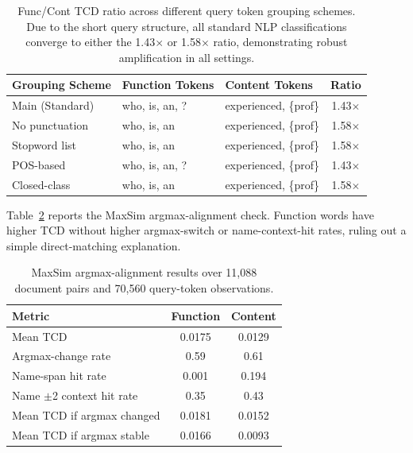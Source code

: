 \documentclass[11pt]{article}
\begin{document}
\begin{table}[!ht]
\centering
\scriptsize
\setlength{\tabcolsep}{2pt}
\begin{tabular}{lp{}p{}c}
\toprule
\textbf{Grouping Scheme} & \textbf{Function Tokens} & \textbf{Content Tokens} & \textbf{Ratio} \\
\midrule
Main (Standard) & who, is, an, ? & experienced, \{prof\} & 1.43$\times$ \\
No punctuation  & who, is, an     & experienced, \{prof\} & 1.58$\times$ \\
Stopword list   & who, is, an     & experienced, \{prof\} & 1.58$\times$ \\
POS-based       & who, is, an, ? & experienced, \{prof\} & 1.43$\times$ \\
Closed-class    & who, is, an     & experienced, \{prof\} & 1.58$\times$ \\
\bottomrule
\end{tabular}
\caption{Func/Cont TCD ratio across different query token grouping schemes. Due to the short query structure, all standard NLP classifications converge to either the 1.43$\times$ or 1.58$\times$ ratio, demonstrating robust amplification in all settings.}
\label{tab:grouping}
\end{table}

Table~\ref{tab:argmax_alignment} reports the MaxSim argmax-alignment check. Function words have higher TCD without higher argmax-switch or name-context-hit rates, ruling out a simple direct-matching explanation.

\begin{table}[t]
\centering
\small
\begin{tabular}{@{}p{}cc@{}}
\toprule
\textbf{Metric} & \textbf{Function} & \textbf{Content} \\
\midrule
Mean TCD & 0.0175 & 0.0129 \\
Argmax-change rate & 0.59 & 0.61 \\
Name-span hit rate & 0.001 & 0.194 \\
Name $\pm$2 context hit rate & 0.35 & 0.43 \\
Mean TCD if argmax changed & 0.0181 & 0.0152 \\
Mean TCD if argmax stable & 0.0166 & 0.0093 \\
\bottomrule
\end{tabular}
\caption{MaxSim argmax-alignment results over 11{,}088 document pairs and 70{,}560 query-token observations.}
\label{tab:argmax_alignment}
\end{table}
\end{document}
